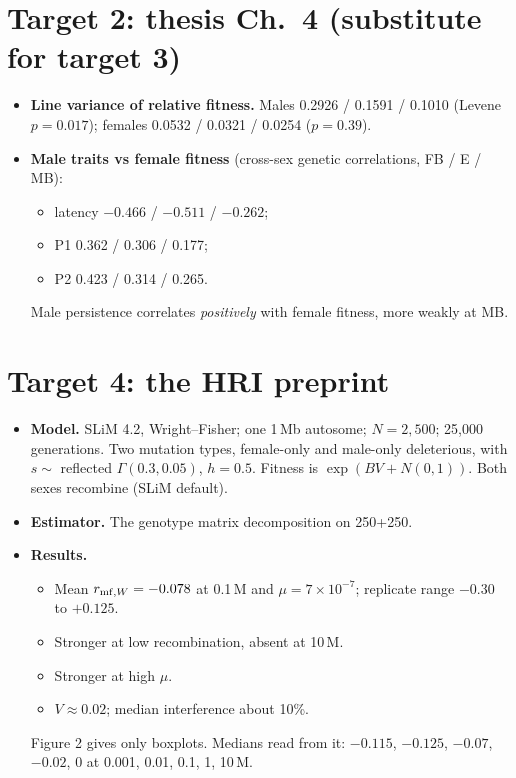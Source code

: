 \section{Target 2: thesis Ch.\ 4 (substitute for target 3)}
\begin{itemize}
\item \textbf{Line variance of relative fitness.} Males 0.2926 / 0.1591 / 0.1010 (Levene $p=0.017$); females 0.0532 / 0.0321 / 0.0254 ($p=0.39$).
\item \textbf{Male traits vs female fitness} (cross-sex genetic correlations, FB / E / MB):
  \begin{itemize}
  \item latency $-0.466$ / $-0.511$ / $-0.262$;
  \item P1 0.362 / 0.306 / 0.177;
  \item P2 0.423 / 0.314 / 0.265.
  \end{itemize}
  Male persistence correlates \emph{positively} with female fitness, more weakly at MB.
\end{itemize}

\section{Target 4: the HRI preprint}
\begin{itemize}
\item \textbf{Model.} SLiM 4.2, Wright--Fisher; one 1\,Mb autosome; $N=2{,}500$; 25,000 generations. Two mutation types, female-only and male-only deleterious, with $s\sim$ reflected $\Gamma(0.3,0.05)$, $h=0.5$. Fitness is $\exp(BV+N(0,1))$. Both sexes recombine (SLiM default).
\item \textbf{Estimator.} The genotype matrix decomposition on 250\female+250\male.
\item \textbf{Results.}
  \begin{itemize}
  \item Mean $r_{\mathrm{mf},W}=-0.078$ at 0.1\,M and $\mu=7\times10^{-7}$; replicate range $-0.30$ to $+0.125$.
  \item Stronger at low recombination, absent at 10\,M.
  \item Stronger at high $\mu$.
  \item $V\approx0.02$; median interference about 10\%.
  \end{itemize}
  Figure 2 gives only boxplots. Medians read from it: $-0.115$, $-0.125$, $-0.07$, $-0.02$, $0$ at 0.001, 0.01, 0.1, 1, 10\,M.
\end{itemize}

